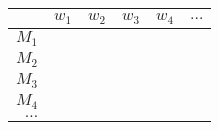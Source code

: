 
\begin{longtable}{|r||r|r|r|r|r|}
\hline 
         & $w_1$ & $w_2$ & $w_3$ & $w_4$ & $\ldots$ \\ \hline \hline 
$M_1$    &       &       &       &       &          \\ \hline 
$M_2$    &       &       &       &       &          \\ \hline 
$M_3$    &       &       &       &       &          \\ \hline 
$M_4$    &       &       &       &       &          \\ \hline 
$\ldots$ &       &       &       &       &          \\ \hline 
\end{longtable}
        
